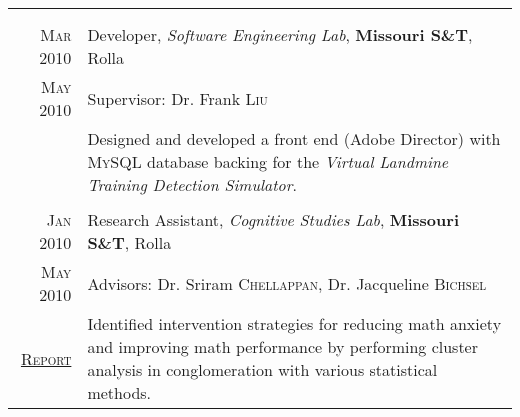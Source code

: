 \documentclass[a4paper,11pt]{article}
\begin{document}
\begin{longtable}{r|p{12.5cm}}
{\begin{minipage}[t]{12.5cm}
 \end{minipage}}
 \\
 \multicolumn{2}{c}{}
 \\
 \textsc{Mar 2010} & Developer, \emph{Software Engineering Lab}, \normalsize \textbf{Missouri S\&T}, Rolla \\
 \textsc{May 2010} & \small Supervisor: Dr. Frank \textsc{Liu} \\
 & \footnotesize{ \begin{minipage}[t]{12.5cm} Designed and developed a front end (Adobe Director) with \textsc{MySQL} database backing for the \emph{Virtual Landmine Training Detection Simulator}.
 \end{minipage}}
 \\
 \multicolumn{2}{c}{}
 \\
 \textsc{Jan 2010} & Research Assistant, \emph{Cognitive Studies Lab}, \normalsize \textbf{Missouri S\&T}, Rolla \\
 \textsc{May 2010} & \small Advisors: Dr. Sriram \textsc{Chellappan}, Dr. Jacqueline \textsc{Bichsel} \\
 \textsc{\href{https://github.com/raghakot/papers/blob/master/math_anxiety.pdf}{Report}} & \footnotesize{\begin{minipage}[t]{12.5cm} Identified intervention strategies for reducing math anxiety and improving math performance by performing cluster analysis in conglomeration with various statistical methods.
 \end{minipage}}\\
\end{longtable}
\end{document}
